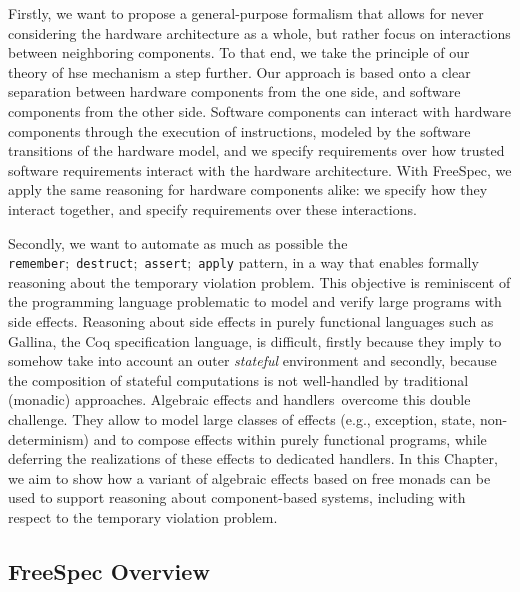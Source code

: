 Firstly, we want to propose a general-purpose formalism that allows for never
considering the hardware architecture as a whole, but rather focus on
interactions between neighboring components.
%
To that end, we take the principle of our theory of \ac{hse} mechanism a step
further.
%
Our approach is based onto a clear separation between hardware components from the
one side, and software components from the other side.
%
Software components can interact with hardware components through the execution
of instructions, modeled by the software transitions of the hardware model, and
we specify requirements over how trusted software requirements interact with the
hardware architecture.
%
With FreeSpec, we apply the same reasoning for hardware components alike: we
specify how they interact together, and specify requirements over these
interactions.

Secondly, we want to automate as much as possible the
\texttt{remember};~\texttt{destruct};~\texttt{assert};~\texttt{apply} pattern,
in a way that enables formally reasoning about the temporary violation problem.
%
This objective is reminiscent of the programming language problematic to model
and verify large programs with side effects.
%
Reasoning about side effects in purely functional languages such as {\textsc
  Gallina}, the Coq specification language, is difficult, firstly because they
imply to somehow take into account an outer \emph{stateful} environment and
secondly, because the composition of stateful computations is not well-handled
by traditional (monadic) approaches.
%
Algebraic effects and handlers\,\cite{bauer2015effects} overcome this double
challenge.
%
They allow to model large classes of effects (e.g., exception, state,
non-determinism) and to compose effects within purely functional programs, while
deferring the realizations of these effects to dedicated handlers.
%
In this Chapter, we aim to show how a variant of algebraic effects based on free
monads can be used to support reasoning about component-based systems, including
with respect to the temporary violation problem.

\subsection{FreeSpec Overview}
\label{freespec:subsec:freespecoverview}

